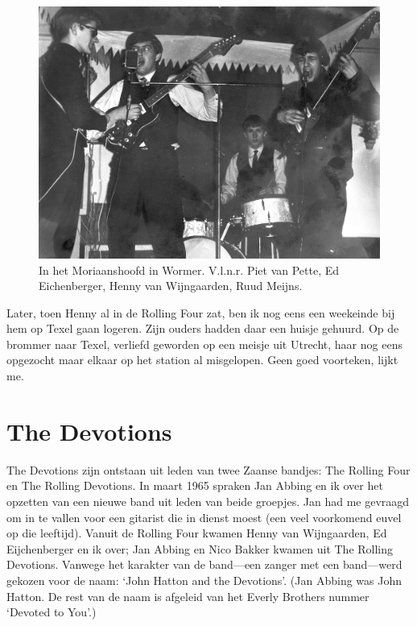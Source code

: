 \documentclass[10pt,twoside, openright]{memoir}
\begin{document}
\begin{figure}
\includegraphics[width=\textwidth]{img/147-MoriaanA}
\caption*{\footnotesize In het Moriaanshoofd in Wormer. V.l.n.r. Piet van Pette, Ed Eichenberger, Henny van Wijngaarden, Ruud Meijns.}
\end{figure}

Later, toen Henny al in de Rolling Four zat, ben ik nog eens een weekeinde bij hem op Texel gaan logeren. Zijn ouders hadden daar een huisje gehuurd. Op de brommer naar Texel, verliefd geworden op een meisje uit Utrecht, haar nog eens opgezocht maar elkaar op het station al misgelopen. Geen goed voorteken, lijkt me.

\section{The Devotions} %
\label{cha:devotions}

The Devotions zijn ontstaan uit leden van twee Zaanse bandjes: The Rolling Four en The Rolling Devotions. In maart 1965 spraken Jan Abbing en ik over het opzetten van een nieuwe band uit leden van beide groepjes. Jan had me gevraagd om in te vallen voor een gitarist die in dienst moest (een veel voorkomend euvel op die leeftijd). Vanuit de Rolling Four kwamen Henny van Wijngaarden, Ed Eijchenberger en ik over; Jan Abbing en Nico Bakker kwamen uit The Rolling Devotions. Vanwege het karakter van de band---een zanger met een band---werd gekozen voor de naam: `John Hatton and the Devotions'. (Jan Abbing was John Hatton. De rest van de naam is afgeleid van het Everly Brothers nummer `Devoted to You'.)
\end{document}
